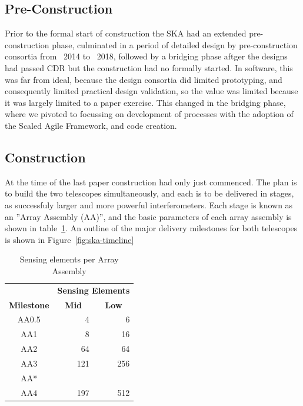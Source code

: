 \documentclass[a4paper,
               biblatex,     %
               keeplastbox,   %
               ]{jacow}
\begin{document}
\subsection{Pre-Construction}
Prior to the formal start of construction the SKA had an extended pre-construction phase, culminated in a period of detailed design by pre-construction consortia from ~2014 to ~2018, followed by a bridging phase aftger the designs had passed CDR but the construction had no formally started. In software, this was far from ideal, because the design consortia did limited prototyping, and consequently limited practical design validation, so the value was limited because it was largely limited to a paper exercise. This changed in the bridging phase, where we pivoted to focussing on development of processes with the adoption of the Scaled Agile Framework, and code creation.

\subsection{Construction}
At the time of the last paper construction had only just commenced. The plan is to build the two telescopes simultaneously, and each is to be delivered in stages, as successfuly larger and more powerful interferometers. Each stage is known as an ''Array Assembly (AA)'', and the basic parameters of each array assembly is shown in table~\ref{tab:array-assemblies}. An outline of the major delivery milestones for both telescopes is shown in Figure~\ref{fig:ska-timeline}

\begin{table}[!h]
	\centering
	\caption{Sensing elements per Array Assembly}
	 \begin{tabular}{crr}
		 \toprule
							& \multicolumn{2}{c}{\textbf{Sensing Elements}}  \\
		 \textbf{Milestone} & \multicolumn{1}{c}{\textbf{Mid}} & \multicolumn{1}{c}{\textbf{Low}}  \\
		 \midrule
			AA0.5  &    4  &    6   \\
			 AA1   &    8  &   16  \\
			 AA2   &   64  &   64  \\
			 AA3   &  121  &  256  \\
			 AA*   &       &       \\
			 AA4   &  197  &  512  \\
		 \bottomrule
	 \end{tabular}
	\label{tab:array-assemblies}
 \end{table}
\end{document}

